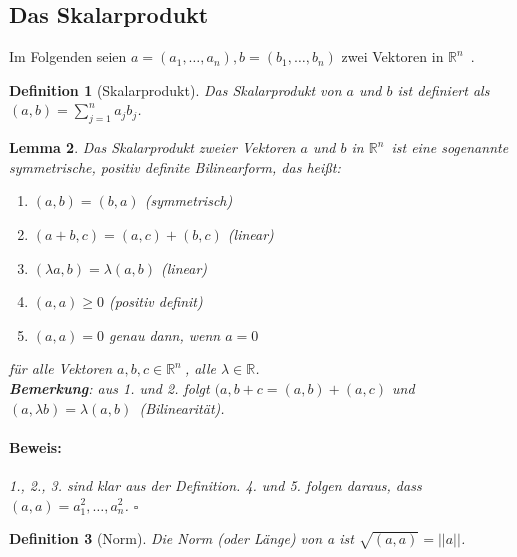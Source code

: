 \documentclass{report}
\newcommand{\lb}{\lambda}
\newcommand{\R}{\mathbb{R}}
\newcommand{\Rn}{\mathbb{R}^n\ }
\newcommand{\mRn}{$\mathbb{R}^n$\ }
\theoremstyle{customrem}
\theoremstyle{customdef}
\newtheorem{definition}{Definition}[chapter]
\newtheorem{lem}[definition]{Lemma}
\renewenvironment{proof}{\vspace{-.75cm}\paragraph{Beweis: }}{\hfill$\square$}
\begin{document}
\subsection{Das Skalarprodukt}
	Im Folgenden seien $a = (a_1, \dots, a_n), b = (b_1, \dots, b_n)$ zwei Vektoren in \mRn.
	\begin{definition}[Skalarprodukt]
		Das Skalarprodukt von $a$ und $b$ ist definiert als $(a, b) = \sum_{j=1}^n a_j b_j$.
	\end{definition}
	\begin{lem}
		Das Skalarprodukt zweier Vektoren $a$ und $b$ in \mRn ist eine sogenannte symmetrische, positiv definite Bilinearform, das heißt:
		\begin{enumerate}
			\item $(a, b) = (b, a)$ (symmetrisch) 
			\item $(a + b, c) = (a, c) + (b, c)$ (linear) 
			\item $(\lb a, b) = \lb(a, b)$ (linear) 
			\item $(a, a) \ge 0$ (positiv definit) 
			\item $(a, a) = 0$ genau dann, wenn $a=0$ 
		\end{enumerate}
		für alle Vektoren $a, b, c \in \Rn$, alle $\lb \in \R$.\\
		\textbf{Bemerkung}: aus 1. und 2. folgt $(a, b+c = (a,b) + (a,c)$ und $(a, \lb b) = \lb (a, b)$\ (Bilinearität).\\
		\begin{proof}
			1., 2., 3. sind klar aus der Definition. 4. und 5. folgen daraus, dass $(a, a) = a_1^2, \ldots, a_n^2$.
		\end{proof}
	\end{lem}

	\begin{definition}[Norm]
		Die Norm (oder Länge) von a ist $\sqrt{(a, a)} = ||a||$.
	\end{definition}
\end{document}
